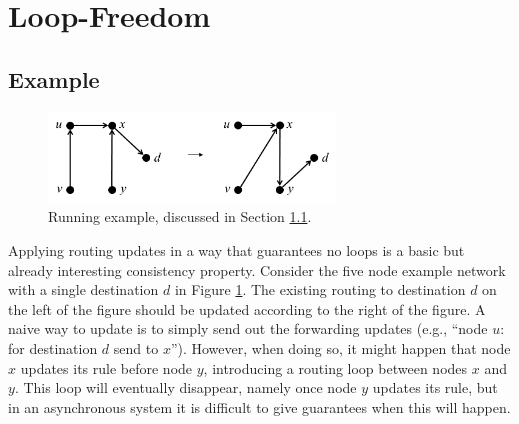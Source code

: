 \section{Loop-Freedom}
\label{sec:loop-free}

\subsection{Example}
\label{sec:example}

\begin{figure}[t!]
\includegraphics[width=3in]{figures/noloops.png}
\caption{Running example, discussed in Section \ref{sec:example}.}
\label{fig:example}
\end{figure}

Applying routing updates in a way that guarantees no loops is a basic but already interesting consistency property. Consider the five node example network with a single destination $d$ in Figure \ref{fig:example}. The existing routing to destination $d$ on the left of the figure should be updated according to the right of the figure. A naive way to update is to simply send out the forwarding updates (e.g., ``node $u$: for destination $d$ send to $x$''). However, when doing so, it might happen that node $x$ updates its rule before node $y$, introducing a routing loop between nodes $x$ and $y$. This loop will eventually disappear, namely once node $y$ updates its rule, but in an asynchronous system it is difficult to give guarantees when this will happen.

